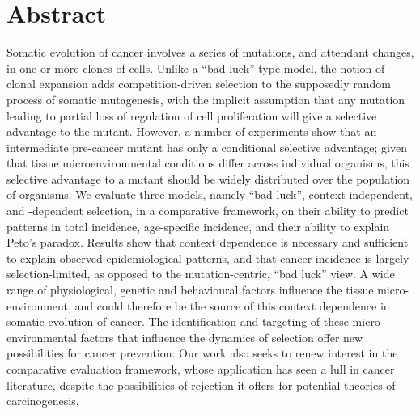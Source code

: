 \documentclass[a0,landscape]{a0poster}
\begin{document}
\color{NavyBlue} %
\large
\section*{Abstract}
	Somatic evolution of cancer involves a series of mutations, and attendant changes, in one or more clones of cells. Unlike a ``bad luck'' type model, the notion of clonal expansion adds competition-driven selection to the supposedly random process of somatic mutagenesis, with the implicit assumption that any mutation leading to partial loss of regulation of cell proliferation will give a selective advantage to the mutant. However, a number of experiments show that an intermediate pre-cancer mutant has only a conditional selective advantage; given that tissue microenvironmental conditions differ across individual organisms, this selective advantage to a mutant should be widely distributed over the population of organisms. We evaluate three models, namely ``bad luck'', context-independent, and -dependent selection, in a comparative framework, on their ability to predict patterns in total incidence, age-specific incidence, and their ability to explain Peto’s paradox. Results show that context dependence is necessary and sufficient to explain observed epidemiological patterns, and that cancer incidence is largely selection-limited, as opposed to the mutation-centric, ``bad luck'' view. A wide range of physiological, genetic and behavioural factors influence the tissue micro-environment, and could therefore be the source of this context dependence in somatic evolution of cancer. The identification and targeting of these micro-environmental factors that influence the dynamics of selection offer new possibilities for cancer prevention. Our work also seeks to renew interest in the comparative evaluation framework, whose application has seen a lull in cancer literature, despite the possibilities of rejection it offers for potential theories of carcinogenesis.
\end{document}
